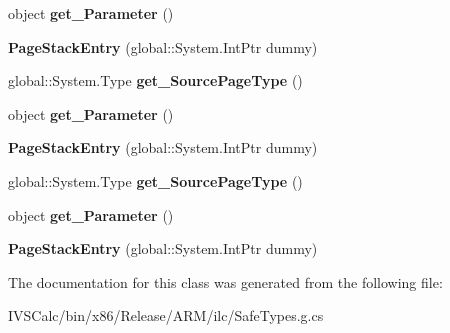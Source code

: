 \begin{DoxyCompactItemize}
\item 
\mbox{\label{class_windows_1_1_u_i_1_1_xaml_1_1_navigation_1_1_page_stack_entry_a35c6f828e5f9e93c01014a3d506cd2ec}} 
object {\bfseries get\+\_\+\+Parameter} ()
\item 
\mbox{\label{class_windows_1_1_u_i_1_1_xaml_1_1_navigation_1_1_page_stack_entry_ab00ea88dba984356be70eb26668b16eb}} 
{\bfseries Page\+Stack\+Entry} (global\+::\+System.\+Int\+Ptr dummy)
\item 
\mbox{\label{class_windows_1_1_u_i_1_1_xaml_1_1_navigation_1_1_page_stack_entry_a84f6fa686f2a85235124c00d356e706f}} 
global\+::\+System.\+Type {\bfseries get\+\_\+\+Source\+Page\+Type} ()
\item 
\mbox{\label{class_windows_1_1_u_i_1_1_xaml_1_1_navigation_1_1_page_stack_entry_a35c6f828e5f9e93c01014a3d506cd2ec}} 
object {\bfseries get\+\_\+\+Parameter} ()
\item 
\mbox{\label{class_windows_1_1_u_i_1_1_xaml_1_1_navigation_1_1_page_stack_entry_ab00ea88dba984356be70eb26668b16eb}} 
{\bfseries Page\+Stack\+Entry} (global\+::\+System.\+Int\+Ptr dummy)
\item 
\mbox{\label{class_windows_1_1_u_i_1_1_xaml_1_1_navigation_1_1_page_stack_entry_a84f6fa686f2a85235124c00d356e706f}} 
global\+::\+System.\+Type {\bfseries get\+\_\+\+Source\+Page\+Type} ()
\item 
\mbox{\label{class_windows_1_1_u_i_1_1_xaml_1_1_navigation_1_1_page_stack_entry_a35c6f828e5f9e93c01014a3d506cd2ec}} 
object {\bfseries get\+\_\+\+Parameter} ()
\item 
\mbox{\label{class_windows_1_1_u_i_1_1_xaml_1_1_navigation_1_1_page_stack_entry_ab00ea88dba984356be70eb26668b16eb}} 
{\bfseries Page\+Stack\+Entry} (global\+::\+System.\+Int\+Ptr dummy)
\end{DoxyCompactItemize}


The documentation for this class was generated from the following file\+:\begin{DoxyCompactItemize}
\item 
I\+V\+S\+Calc/bin/x86/\+Release/\+A\+R\+M/ilc/Safe\+Types.\+g.\+cs\end{DoxyCompactItemize}
